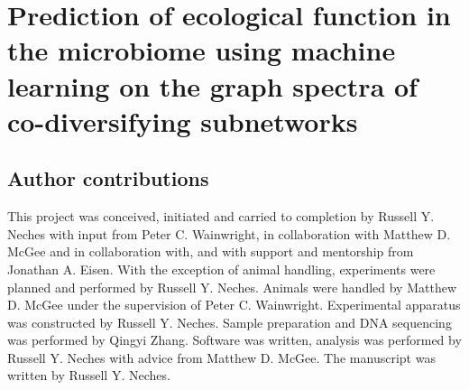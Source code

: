 

\chapter{Prediction of ecological function in the microbiome using machine learning on the graph spectra of co-diversifying subnetworks}


\section{Author contributions}

This project was conceived, initiated and carried to completion by Russell Y. Neches with input from Peter C. Wainwright, in collaboration with Matthew D. McGee and in collaboration with, and with support and mentorship from Jonathan A. Eisen. With the exception of animal handling, experiments were planned and performed by Russell Y. Neches. Animals were handled by Matthew D. McGee under the supervision of Peter C. Wainwright. Experimental apparatus was constructed by Russell Y. Neches. Sample preparation and DNA sequencing was performed by Qingyi Zhang. Software was written, analysis was performed by Russell Y. Neches with advice from Matthew D. McGee. The manuscript was written by Russell Y. Neches.












